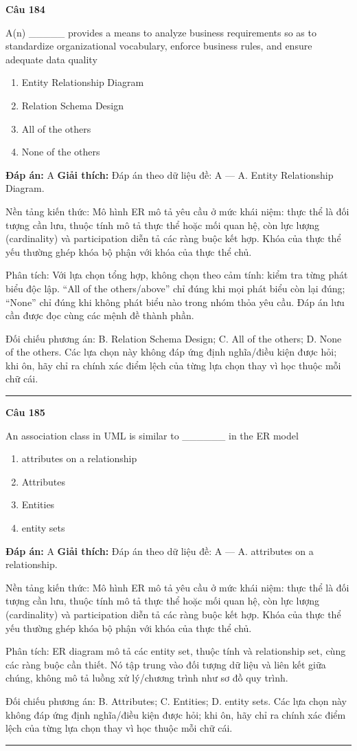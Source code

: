 \documentclass[11pt,a4paper]{article}
\newenvironment{question}[1]{%
  \par\vspace{1em}\noindent\textbf{\large Câu #1}\par\vspace{0.4em}
}{%
  \par\vspace{1em}\hrule\vspace{0.6em}
}
\newenvironment{choices}{%
  \begin{enumerate}[label=\textbf{\Alph*.},leftmargin=2.2em,itemsep=2pt,topsep=3pt]
}{%
  \end{enumerate}
}
\newcommand{\choice}{\item}
\begin{document}
\begin{question}{184}
A(n) _____ provides a means to analyze business requirements so as to standardize organizational vocabulary, enforce business rules, and ensure adequate data quality
\begin{choices}
\choice Entity Relationship Diagram
\choice Relation Schema Design
\choice All of the others
\choice None of the others
\end{choices}
\textbf{Đáp án:} A
\textbf{Giải thích:} Đáp án theo dữ liệu đề: A — A. Entity Relationship Diagram.

Nền tảng kiến thức: Mô hình ER mô tả yêu cầu ở mức khái niệm: thực thể là đối tượng cần lưu, thuộc tính mô tả thực thể hoặc mối quan hệ, còn lực lượng (cardinality) và participation diễn tả các ràng buộc kết hợp. Khóa của thực thể yếu thường ghép khóa bộ phận với khóa của thực thể chủ.

Phân tích: Với lựa chọn tổng hợp, không chọn theo cảm tính: kiểm tra từng phát biểu độc lập. “All of the others/above” chỉ đúng khi mọi phát biểu còn lại đúng; “None” chỉ đúng khi không phát biểu nào trong nhóm thỏa yêu cầu. Đáp án lưu cần được đọc cùng các mệnh đề thành phần.

Đối chiếu phương án: B. Relation Schema Design; C. All of the others; D. None of the others. Các lựa chọn này không đáp ứng định nghĩa/điều kiện được hỏi; khi ôn, hãy chỉ ra chính xác điểm lệch của từng lựa chọn thay vì học thuộc mỗi chữ cái.
\end{question}

\begin{question}{185}
An association class in UML is similar to ______ in the ER model
\begin{choices}
\choice attributes on a relationship
\choice Attributes
\choice Entities
\choice entity sets
\end{choices}
\textbf{Đáp án:} A
\textbf{Giải thích:} Đáp án theo dữ liệu đề: A — A. attributes on a relationship.

Nền tảng kiến thức: Mô hình ER mô tả yêu cầu ở mức khái niệm: thực thể là đối tượng cần lưu, thuộc tính mô tả thực thể hoặc mối quan hệ, còn lực lượng (cardinality) và participation diễn tả các ràng buộc kết hợp. Khóa của thực thể yếu thường ghép khóa bộ phận với khóa của thực thể chủ.

Phân tích: ER diagram mô tả các entity set, thuộc tính và relationship set, cùng các ràng buộc cần thiết. Nó tập trung vào đối tượng dữ liệu và liên kết giữa chúng, không mô tả luồng xử lý/chương trình như sơ đồ quy trình.

Đối chiếu phương án: B. Attributes; C. Entities; D. entity sets. Các lựa chọn này không đáp ứng định nghĩa/điều kiện được hỏi; khi ôn, hãy chỉ ra chính xác điểm lệch của từng lựa chọn thay vì học thuộc mỗi chữ cái.
\end{question}
\end{document}
